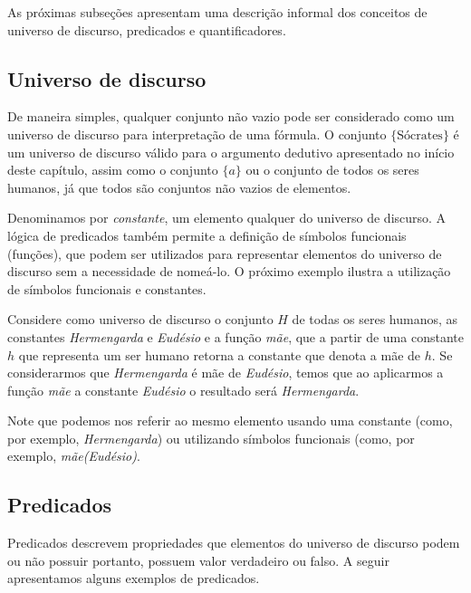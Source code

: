As próximas subseções apresentam uma descrição informal dos conceitos
de universo de discurso, predicados e quantificadores.

\subsection{Universo de discurso}

De maneira simples, qualquer conjunto não vazio pode ser considerado
como um universo de discurso para interpretação de uma fórmula.
O conjunto $\{\text{Sócrates}\}$ é um universo de discurso válido para o
argumento dedutivo apresentado no início deste capítulo, assim como o
conjunto $\{a\}$ ou o conjunto de todos os seres humanos,
já que todos são conjuntos não vazios de elementos.

Denominamos por \textit{constante}, um elemento qualquer do
universo de discurso. A lógica de predicados também permite a
definição de símbolos funcionais (funções), que podem ser utilizados
para representar elementos do universo de discurso sem a necessidade
de nomeá-lo. O próximo exemplo ilustra a utilização de símbolos
funcionais e constantes.

\begin{Example}
Considere como universo de discurso o conjunto $H$ de todas os seres
humanos, as constantes \textit{Hermengarda} e \textit{Eudésio} e a
função \textit{mãe}, que a partir de uma constante $h$ que representa um
ser humano retorna a constante que denota a mãe de $h$. Se
considerarmos que \textit{Hermengarda} é mãe de \textit{Eudésio}, temos que ao
aplicarmos a função \textit{mãe} a constante \textit{Eudésio} o
resultado será \textit{Hermengarda}.

Note que podemos nos referir ao mesmo elemento usando uma constante
(como, por exemplo, \textit{Hermengarda}) ou utilizando símbolos
funcionais (como, por exemplo, \textit{mãe(Eudésio)}.
\end{Example}

\subsection{Predicados}

Predicados descrevem propriedades que elementos do universo de
discurso podem ou não possuir portanto, possuem valor verdadeiro ou
falso. A seguir apresentamos alguns exemplos de predicados.

